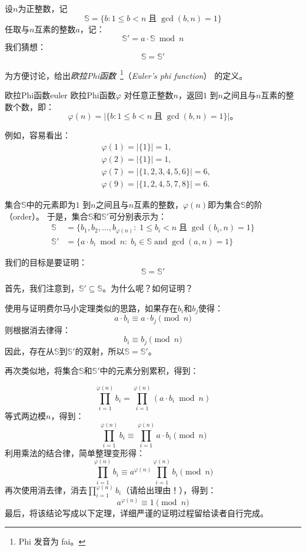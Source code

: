 设$n$为正整数，记
	$$\mathbb{S} = \{ b: 1\leq b < n \; \text{且}\; \gcd(b,n)=1 \}$$
任取与$n$互素的整数$a$，记：
	$$\mathbb{S}' = a \cdot \mathbb{S} \bmod n$$
我们猜想：
	$$\mathbb{S}  = \mathbb{S}'$$

为方便讨论，给出\emph{欧拉Phi函数}~\footnote{Phi 发音为 fai。}（\emph{Euler's phi function}） 的定义。
\begin{definition}{欧拉Phi函数}{euler}
欧拉Phi函数$\varphi$
对任意正整数$n$，返回$1$ 到$n$之间且与$n$互素的整数个数，即：
	$$\varphi(n) = | \{ b: 1\leq b < n \; \text{且}\; \gcd(b,n)=1 \}|\text{。}$$
\end{definition}
例如，容易看出：
\begin{align*}
& \varphi(1)  =  |\{1\}| =  1,\\
& \varphi(2)  =  |\{1\}|  =  1,\\
& \varphi(7)  =  |\{1,2,3,4,5,6\}|  =  6,\\
& \varphi(9)  =  |\{1, 2, 4, 5, 7, 8 \}| =  6.
\end{align*}

集合$\mathbb{S}$中的元素即为$1$ 到$n$之间且与$n$互素的整数，$\varphi(n)$即为集合$\mathbb{S}$的阶（order）。
于是，集合$\mathbb{S}$和$\mathbb{S}'$可分别表示为：
	\begin{align*}
		\mathbb{S} &=  \{ b_1, b_2, \ldots,  b_{\varphi(n)}: \; 1\leq b_i < n \; \text{且}\; \gcd(b_i,n)=1 \} \\
		\mathbb{S}' &=  \{a \cdot b_i \bmod n: \; b_i \in \mathbb{S} \; \text{and}\; \gcd(a,n)=1 \}
	\end{align*}

我们的目标是要证明：
	\[\mathbb{S} = \mathbb{S}'\]

\begin{thinking}
	首先，我们注意到，$\mathbb{S}' \subseteq \mathbb{S}$。为什么呢？如何证明？
\end{thinking}

使用与证明费尔马小定理类似的思路，如果存在$b_i$和$b_j$使得：
	\[a \cdot b_i \equiv a \cdot b_j \pmod{n}\]
则根据消去律得：
	\[b_i \equiv b_j \pmod{n} \]
因此，存在从$\mathbb{S}$到$\mathbb{S}'$的双射，所以$\mathbb{S} = \mathbb{S}'$。

再次类似地，将集合$\mathbb{S}$和$\mathbb{S}'$中的元素分别累积，得到：

	\[\prod_{i = 1}^{\varphi(n)} b_i = \prod_{i=1}^{\varphi(n)} (a \cdot b_i \bmod n)\]
等式两边模$n$，得到：
	\[\prod_{i = 1}^{\varphi(n)} b_i \equiv \prod_{i=1}^{\varphi(n)} a \cdot b_i  \pmod{n}\]
利用乘法的结合律，简单整理变形得：
	\[\prod_{i = 1}^{\varphi(n)} b_i \equiv a^{\varphi(n)} \prod_{i=1}^{\varphi(n)} b_i  \pmod{n}\]
再次使用消去律，消去$\prod_{i = 1}^{\varphi(n)} b_i$（请给出理由！），得到：
	\[a^{\varphi(n)} \equiv 1 \pmod{n}\]
最后，将该结论写成以下定理，详细严谨的证明过程留给读者自行完成。

